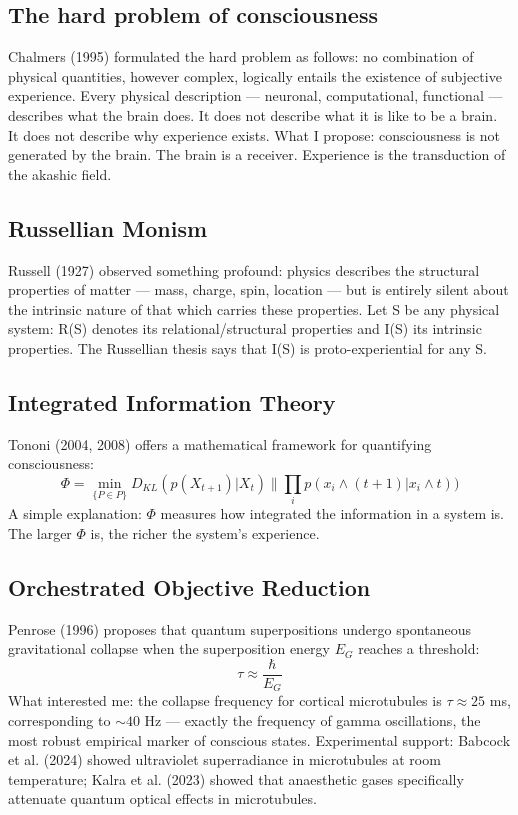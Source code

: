\documentclass[11pt,a4paper]{article}
\begin{document}
\subsection{The hard problem of consciousness}
Chalmers (1995) formulated the hard problem as follows: no combination of physical quantities, however complex, logically entails the existence of subjective experience. Every physical description --- neuronal, computational, functional --- describes what the brain does. It does not describe what it is like to be a brain. It does not describe why experience exists. What I propose: consciousness is not generated by the brain. The brain is a receiver. Experience is the transduction of the akashic field.

\subsection{Russellian Monism}
Russell (1927) observed something profound: physics describes the structural properties of matter --- mass, charge, spin, location --- but is entirely silent about the intrinsic nature of that which carries these properties. Let S be any physical system: R(S) denotes its relational/structural properties and I(S) its intrinsic properties. The Russellian thesis says that I(S) is proto-experiential for any S.

\subsection{Integrated Information Theory}
Tononi (2004, 2008) offers a mathematical framework for quantifying consciousness:
\begin{equation}
\Phi = \min_{\{P \in P\}} D_{KL}(p(X_{t+1})|X_{t}) \parallel \prod_{i} p(x_{i} \land (t+1)|x_{i} \land t))
\end{equation}
A simple explanation: $\Phi$ measures how integrated the information in a system is. The larger $\Phi$ is, the richer the system's experience.

\subsection{Orchestrated Objective Reduction}
Penrose (1996) proposes that quantum superpositions undergo spontaneous gravitational collapse when the superposition energy $E_G$ reaches a threshold:
\begin{equation}
\tau \approx \frac{\hbar}{E_G}
\end{equation}
What interested me: the collapse frequency for cortical microtubules is $\tau \approx 25$ ms, corresponding to $\sim 40$ Hz --- exactly the frequency of gamma oscillations, the most robust empirical marker of conscious states. Experimental support: Babcock et al. (2024) showed ultraviolet superradiance in microtubules at room temperature; Kalra et al. (2023) showed that anaesthetic gases specifically attenuate quantum optical effects in microtubules.
\end{document}
